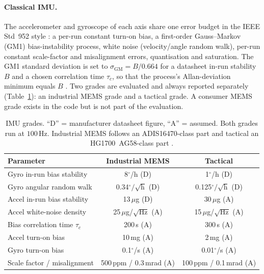 \documentclass[journal]{IEEEtran}
\begin{document}
\paragraph{Classical IMU.}
The accelerometer and gyroscope of each axis share one error budget in the IEEE Std~952 style
\cite{ieee952}: a per-run constant turn-on bias, a first-order Gauss--Markov (GM1) bias-instability
process, white noise (velocity/angle random walk), per-run constant scale-factor and misalignment errors,
quantisation and saturation. The GM1 standard deviation is set to $\sigma_{\mathrm{GM}} = B/0.664$ for a
datasheet in-run stability $B$ and a chosen correlation time $\tau_c$, so that the process's
Allan-deviation minimum equals $B$ \cite{jurado2019regression}. Two grades are evaluated and always reported
separately (Table~\ref{tab:imu}): an industrial MEMS grade and a tactical grade. A consumer MEMS grade
exists in the code but is not part of the evaluation.

\begin{table}[t]
\centering
\caption{IMU grades. ``D'' = manufacturer datasheet figure, ``A'' = assumed. Both grades run at
$100\,\mathrm{Hz}$. Industrial MEMS follows an ADIS16470-class part and tactical an HG1700~AG58-class part
\protect\cite{adi2017adis16470,honeywell2025hg1700}.}
\label{tab:imu}
\small
\begin{tabular}{lcc}
\toprule
Parameter & Industrial MEMS & Tactical \\
\midrule
Gyro in-run bias stability & 8$^\circ$/h (D) & 1$^\circ$/h (D) \\
Gyro angular random walk & 0.34$^\circ/\sqrt{\mathrm{h}}$ (D) & 0.125$^\circ/\sqrt{\mathrm{h}}$ (D) \\
Accel in-run bias stability & 13\,$\mu$g (D) & 30\,$\mu$g (A) \\
Accel white-noise density & 25\,$\mu$g/$\sqrt{\mathrm{Hz}}$ (A) & 15\,$\mu$g/$\sqrt{\mathrm{Hz}}$ (A) \\
Bias correlation time $\tau_c$ & 200\,s (A) & 300\,s (A) \\
Accel turn-on bias & 10\,mg (A) & 2\,mg (A) \\
Gyro turn-on bias & 0.1$^\circ$/s (A) & 0.01$^\circ$/s (A) \\
Scale factor / misalignment & 500\,ppm / 0.3\,mrad (A) & 100\,ppm / 0.1\,mrad (A) \\
\bottomrule
\end{tabular}
\end{table}
\end{document}
